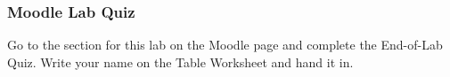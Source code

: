 \documentclass[main.tex]{subfiles}
\begin{document}
\subsubsection{Moodle Lab Quiz}
Go to the section for this lab on the Moodle page and complete the End-of-Lab Quiz. Write your name on the Table Worksheet and hand it in.
\end{document}
